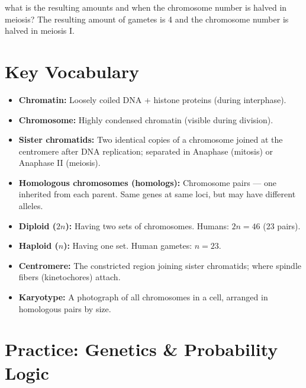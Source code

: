 \documentclass[11pt, letterpaper]{article}
\begin{document}
what is the resulting amounts and when the chromosome number is halved in meiosis? The resulting amount of gametes is 4 and the chromosome number is halved in meiosis I.

\section*{Key Vocabulary}

\begin{itemize}[noitemsep]
  \item \textbf{Chromatin:} Loosely coiled DNA + histone proteins (during interphase).
  \item \textbf{Chromosome:} Highly condensed chromatin (visible during division).
  \item \textbf{Sister chromatids:} Two identical copies of a chromosome joined at the
        centromere after DNA replication; separated in Anaphase (mitosis) or Anaphase II
        (meiosis).
  \item \textbf{Homologous chromosomes (homologs):} Chromosome pairs --- one inherited from
        each parent. Same genes at same loci, but may have different alleles.
  \item \textbf{Diploid ($2n$):} Having two sets of chromosomes. Humans: $2n = 46$ (23 pairs).
  \item \textbf{Haploid ($n$):} Having one set. Human gametes: $n = 23$.
  \item \textbf{Centromere:} The constricted region joining sister chromatids; where spindle
        fibers (kinetochores) attach.
  \item \textbf{Karyotype:} A photograph of all chromosomes in a cell, arranged in homologous
        pairs by size.
\end{itemize}

\newpage


\section*{Practice: Genetics \& Probability Logic}
\end{document}
